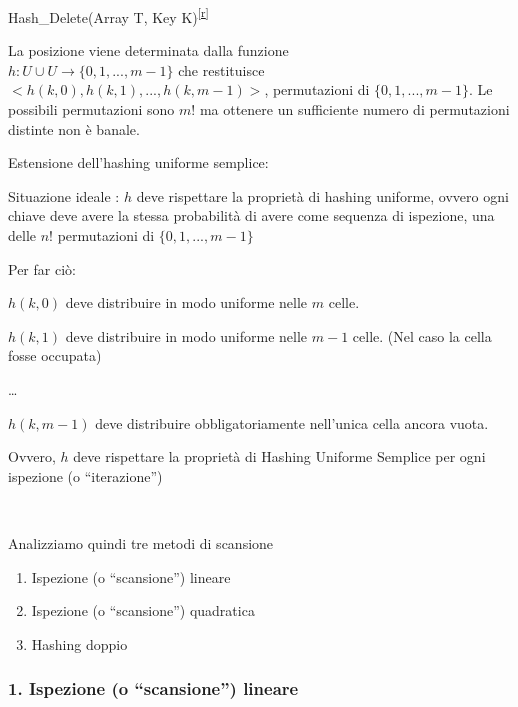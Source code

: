 \documentclass{article}
\providecommand{\tightlist}{%
  \setlength{\itemsep}{0pt}\setlength{\parskip}{0pt}}
\begin{document}
{{}

{Hash\_Delete(Array T, Key
K)}\textsuperscript{\protect\hyperlink{cmnt18}{{[}r{]}}}

{La posizione viene determinata dalla funzione \\ $h:U\cup U\rightarrow \{0,1,...,m-1\}$ che restituisce \\ $<h(k,0),h(k,1),...,h(k,m-1)>$, permutazioni di $\{0,1,...,m-1\}$. Le possibili permutazioni sono $m!$ ma ottenere un sufficiente numero di permutazioni distinte non è banale.}

{}

{Estensione dell'hashing uniforme semplice: }

{Situazione ideale : }{$h$ deve rispettare la proprietà di }{hashing uniforme}{, ovvero ogni chiave deve avere la stessa probabilità di avere come sequenza di ispezione, una delle $n!$ permutazioni di $\{0,1,...,m-1\}$}

{Per far ciò:}

{$h(k,0)$ deve distribuire in modo uniforme nelle $m$ celle.}

{$h(k,1)$ deve distribuire in modo uniforme nelle $m-1$ celle. (Nel caso la cella fosse occupata)}

{\ldots{}}

{$h(k,m-1)$ deve distribuire obbligatoriamente nell'unica cella ancora vuota.}

{}

{Ovvero, $h$ deve rispettare la proprietà di Hashing Uniforme Semplice per ogni ispezione (o ``iterazione'') }

{~}

{Analizziamo quindi tre metodi di scansione}

{}

\begin{enumerate}
\tightlist
\item
  {Ispezione (o ``scansione'') lineare}
\item
  {Ispezione (o ``scansione'') quadratica}
\item
  {Hashing doppio}
\end{enumerate}

{}

\hypertarget{h.i6sv1bn6gjla}{\subsubsection{\texorpdfstring{{1.
}{Ispezione (o ``scansione'')
lineare}}{1. Ispezione (o scansione) lineare}}\label{h.i6sv1bn6gjla}}

}
\end{document}
